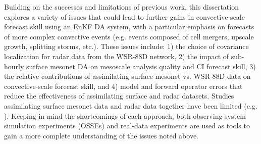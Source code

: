Building on the successes and limitations of previous work, this dissertation explores a variety of issues that could lead to further gains in convective-scale forecast skill using an EnKF DA system, with a particular emphasis on forecasts of more complex convective events (e.g. events composed of cell mergers, upscale growth, splitting storms, etc.). These issues include: 1) the choice of covariance localization for radar data from the WSR-88D network, 2) the impact of sub-hourly surface mesonet DA on mesoscale analysis quality and CI forecast skill, 3) the relative contributions of assimilating surface mesonet vs. WSR-88D data on convective-scale forecast skill, and 4) model and forward operator errors that reduce the effectiveness of assimilating surface and radar datasets. Studies assimilating surface mesonet data and radar data together have been limited (e.g. \citealt{schenkmanetal11b}). Keeping in mind the shortcomings of each approach, both observing system simulation experiments (OSSEs) and real-data experiments are used as tools to gain a more complete understanding of the issues noted above.

